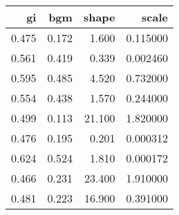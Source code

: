 
\begin{tabular}{r|r|r|r}
\hline
gi & bgm & shape & scale\\
\hline
0.475 & 0.172 & 1.600 & 0.115000\\
\hline
0.561 & 0.419 & 0.339 & 0.002460\\
\hline
0.595 & 0.485 & 4.520 & 0.732000\\
\hline
0.554 & 0.438 & 1.570 & 0.244000\\
\hline
0.499 & 0.113 & 21.100 & 1.820000\\
\hline
0.476 & 0.195 & 0.201 & 0.000312\\
\hline
0.624 & 0.524 & 1.810 & 0.000172\\
\hline
0.466 & 0.231 & 23.400 & 1.910000\\
\hline
0.481 & 0.223 & 16.900 & 0.391000\\
\hline
\end{tabular}

